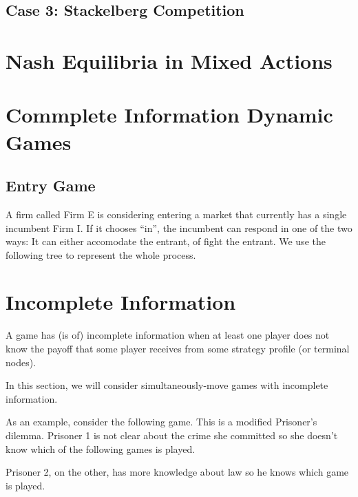 \documentclass[12pt, oneside]{article}
\begin{document}
\subsection{Case 3: Stackelberg Competition}
\newpage
\section{Nash Equilibria in Mixed Actions}
\section{Commplete Information Dynamic Games}
\subsection{Entry Game}
A firm called Firm E is considering entering a market that currently has a single incumbent Firm I. If it chooses “in”, the incumbent can respond in one of the two ways: It can either accomodate the entrant, of fight the entrant. We use the following tree to represent the whole process.

\section{Incomplete Information}
A game has (is of) incomplete information when at least one player does not know the payoff that some player receives from some strategy profile (or terminal nodes).

In this section, we will consider simultaneously-move games with incomplete information.

As an example, consider the following game. This is a modified Prisoner’s dilemma. Prisoner 1 is not clear about the crime she committed so she doesn’t know which of the following games is played.

Prisoner 2, on the other, has more knowledge about law so he knows which game is played.
\end{document}
